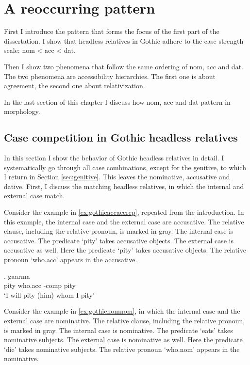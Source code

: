 
\chapter{A reoccurring pattern}

First I introduce the pattern that forms the focus of the first part of the dissertation. I show that headless relatives in Gothic adhere to the case strength scale: \ac{nom} < \ac{acc} < \ac{dat}.

Then I show two phenomena that follow the same ordering of \ac{nom}, \ac{acc} and \ac{dat}. The two phenomena are accessibility hierarchies. The first one is about agreement, the second one about relativization.

In the last section of this chapter I discuss how \ac{nom}, \ac{acc} and \ac{dat} pattern in morphology.


\section{Case competition in Gothic headless relatives}

In this section I show the behavior of Gothic headless relatives in detail. I systematically go through all case combinations, except for the genitive, to which I return in Section \ref{sec:genitive}. This leaves the nominative, accusative and dative. First, I discuss the matching headless relatives, in which the internal and external case match.

Consider the example in \ref{ex:gothicaccaccrep}, repeated from the introduction. In this example, the internal case and the external case are accusative.
The relative clause, including the relative pronoun, is marked in gray.
The internal case is accusative. The predicate  `pity' takes accusative objects.
The external case is accusative as well. Here the predicate  `pity' takes accusative objects.
The relative pronoun  `who.\ac{acc}' appears in the accusative.

\exg. gaarma   \\
 pity\scsub{[acc]} who.\ac{acc} -\ac{comp} pity\scsub{[acc]}\\
 `I will pity (him) whom I pity' \label{ex:gothicaccaccrep}

 Consider the example in \ref{ex:gothicnomnom}, in which the internal case and the external case are nominative.
 The relative clause, including the relative pronoun, is marked in gray.
 The internal case is nominative. The predicate  `eats' takes nominative subjects.
 The external case is nominative as well. Here the predicate  `die' takes nominative subjects.
 The relative pronoun  `who.\ac{nom}' appears in the nominative.

